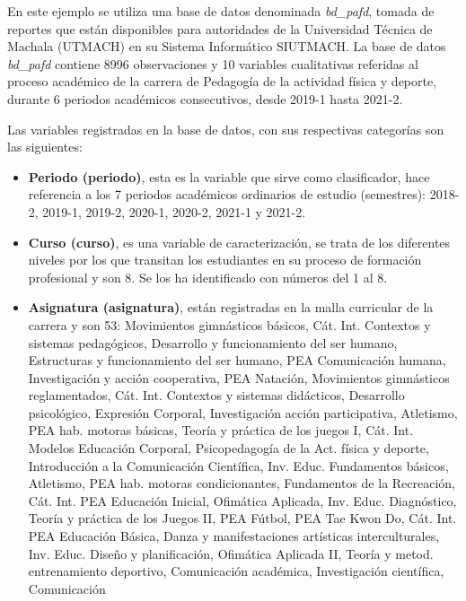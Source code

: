 \documentclass[mathematics,article,submit,moreauthors,pdftex]{mdpi}
\providecommand{\tightlist}{%
  \setlength{\itemsep}{0pt}\setlength{\parskip}{4pt}}
\begin{document}
En este ejemplo se utiliza una base de datos denominada \emph{bd\_pafd},
tomada de reportes que están disponibles para autoridades de la
Universidad Técnica de Machala (UTMACH) en su Sistema Informático
SIUTMACH. La base de datos \emph{bd\_pafd} contiene 8996 observaciones y
10 variables cualitativas referidas al proceso académico de la carrera
de Pedagogía de la actividad física y deporte, durante 6 periodos
académicos consecutivos, desde 2019-1 hasta 2021-2.

Las variables registradas en la base de datos, con sus respectivas
categorías son las siguientes:

\begin{itemize}
\tightlist
\item
  \textbf{Periodo (periodo)}, esta es la variable que sirve como
  clasificador, hace referencia a los 7 periodos académicos ordinarios
  de estudio (semestres): 2018-2, 2019-1, 2019-2, 2020-1, 2020-2, 2021-1
  y 2021-2.\\
\item
  \textbf{Curso (curso)}, es una variable de caracterización, se trata
  de los diferentes niveles por los que transitan los estudiantes en su
  proceso de formación profesional y son 8. Se los ha identificado con
  números del 1 al 8.\\
\item
  \textbf{Asignatura (asignatura)}, están registradas en la malla
  curricular de la carrera y son 53: Movimientos gimnásticos básicos,
  Cát. Int. Contextos y sistemas pedagógicos, Desarrollo y
  funcionamiento del ser humano, Estructuras y funcionamiento del ser
  humano, PEA Comunicación humana, Investigación y acción cooperativa,
  PEA Natación, Movimientos gimnásticos reglamentados, Cát. Int.
  Contextos y sistemas didácticos, Desarrollo psicológico, Expresión
  Corporal, Investigación acción participativa, Atletismo, PEA hab.
  motoras básicas, Teoría y práctica de los juegos I, Cát. Int. Modelos
  Educación Corporal, Psicopedagogía de la Act. física y deporte,
  Introducción a la Comunicación Científica, Inv. Educ. Fundamentos
  básicos, Atletismo, PEA hab. motoras condicionantes, Fundamentos de la
  Recreación, Cát. Int. PEA Educación Inicial, Ofimática Aplicada, Inv.
  Educ. Diagnóstico, Teoría y práctica de los Juegos II, PEA Fútbol, PEA
  Tae Kwon Do, Cát. Int. PEA Educación Básica, Danza y manifestaciones
  artísticas interculturales, Inv. Educ. Diseño y planificación,
  Ofimática Aplicada II, Teoría y metod. entrenamiento deportivo,
  Comunicación académica, Investigación científica, Comunicación

\end{itemize}
\end{document}
